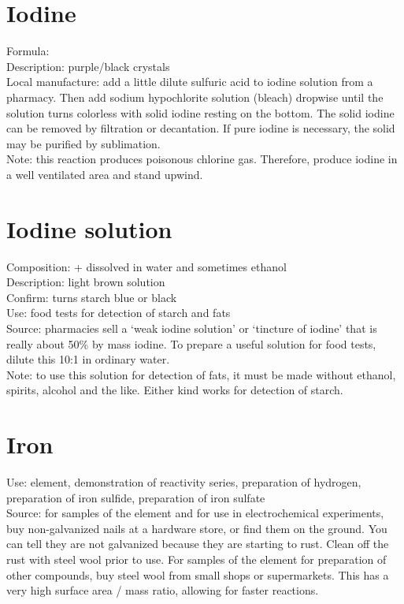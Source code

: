 \section{Iodine}
\label{sec:}
Formula: \\
Description: purple/black crystals\\
Local manufacture: add a little dilute sulfuric acid 
to iodine solution from a pharmacy. 
Then add sodium hypochlorite solution (bleach) dropwise 
until the solution turns colorless with solid iodine resting on the bottom. 
The solid iodine can be removed by filtration or decantation. 
If pure iodine is necessary, 
the solid may be purified by sublimation.\\
Note: this reaction produces poisonous chlorine gas. 
Therefore, 
produce iodine in a well ventilated area and stand upwind.

\section{Iodine solution}
\label{sec:iodinesol}
Composition:  +  dissolved in water and sometimes ethanol\\
Description: light brown solution\\
Confirm: turns starch blue or black\\
Use: food tests for detection of starch and fats\\
Source: pharmacies sell a ‘weak iodine solution’ 
or ‘tincture of iodine’ that is really about 50\% by mass iodine. 
To prepare a useful solution for food tests, 
dilute this 10:1 in ordinary water.\\
Note: to use this solution for detection of fats, 
it must be made without ethanol, 
spirits, 
alcohol and the like. 
Either kind works for detection of starch.

\section{Iron}
\label{sec:iron}
Use: element, 
demonstration of reactivity series, 
preparation of hydrogen, 
preparation of iron sulfide, 
preparation of iron sulfate\\
Source: for samples of the element 
and for use in electrochemical experiments, 
buy non-galvanized nails at a hardware store, 
or find them on the ground. 
You can tell they are not galvanized because they are starting to rust. 
Clean off the rust with steel wool prior to use. 
For samples of the element for preparation of other compounds, 
buy steel wool from small shops or supermarkets. 
This has a very high surface area / mass ratio, 
allowing for faster reactions.

